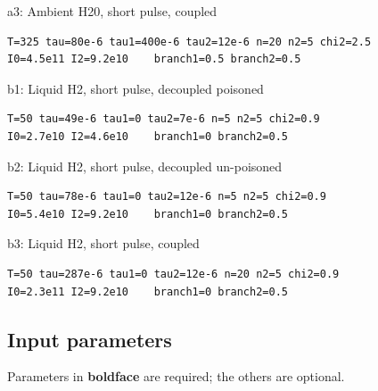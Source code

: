 a3: Ambient H20, short pulse, coupled

\begin{verbatim}
T=325 tau=80e-6 tau1=400e-6 tau2=12e-6 n=20 n2=5 chi2=2.5
I0=4.5e11 I2=9.2e10    branch1=0.5 branch2=0.5
\end{verbatim}

b1: Liquid H2, short pulse, decoupled poisoned

\begin{verbatim}
T=50 tau=49e-6 tau1=0 tau2=7e-6 n=5 n2=5 chi2=0.9
I0=2.7e10 I2=4.6e10    branch1=0 branch2=0.5
\end{verbatim}

b2: Liquid H2, short pulse, decoupled un-poisoned

\begin{verbatim}
T=50 tau=78e-6 tau1=0 tau2=12e-6 n=5 n2=5 chi2=0.9
I0=5.4e10 I2=9.2e10    branch1=0 branch2=0.5
\end{verbatim}

b3: Liquid H2, short pulse, coupled

\begin{verbatim}
T=50 tau=287e-6 tau1=0 tau2=12e-6 n=20 n2=5 chi2=0.9
I0=2.3e11 I2=9.2e10    branch1=0 branch2=0.5
\end{verbatim}

\subsection*{Input parameters}
Parameters in \textbf{boldface} are required; the others are optional.

